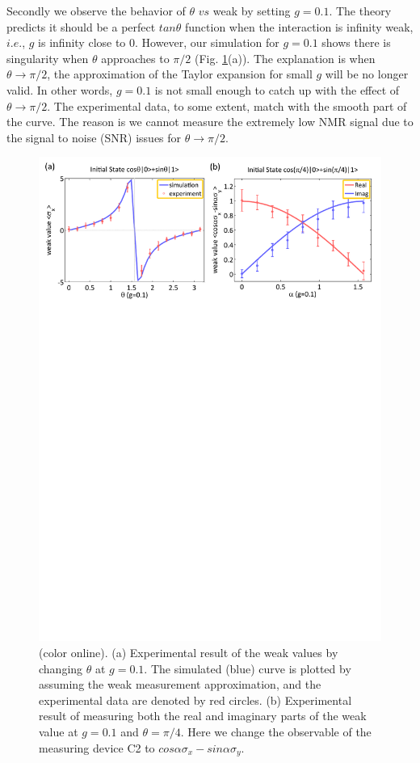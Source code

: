 \documentclass[prl,twocolumn,showpacs]{revtex4}
\begin{document}
Secondly we observe the behavior of $\theta$ $vs$ weak by setting $g=0.1$. The theory predicts it should be a perfect $tan\theta$ function when the interaction is infinity weak, $i.e.$, $g$ is infinity close to 0. However, our simulation for $g=0.1$ shows there is singularity when $\theta$ approaches to $\pi/2$ (Fig. \ref{thetaweak}(a)). The explanation is when $\theta \rightarrow \pi/2$, the approximation of the Taylor expansion for small $g$ will be no longer valid. In other words, $g=0.1$ is not small enough to catch up with the effect of $\theta \rightarrow \pi/2$. The experimental data, to some extent, match with the smooth part of the curve. The reason is we cannot measure the extremely low NMR signal due to the signal to noise (SNR) issues for $\theta \rightarrow \pi/2$.

\begin{figure}[h] \centering
\includegraphics[width=\columnwidth]{thetaweak.pdf}
\caption{(color online). (a) Experimental result of the weak values by changing $\theta$ at $g=0.1$. The simulated (blue) curve is plotted by assuming the weak measurement approximation, and the experimental data are denoted by red circles. (b) Experimental result of measuring both the real and imaginary parts of the weak value at $g=0.1$ and $\theta = \pi/4$. Here we change the observable of the measuring device C2 to $cos\alpha \sigma_x - sin\alpha \sigma_y$.}\label{thetaweak}
\end{figure}
\end{document}
